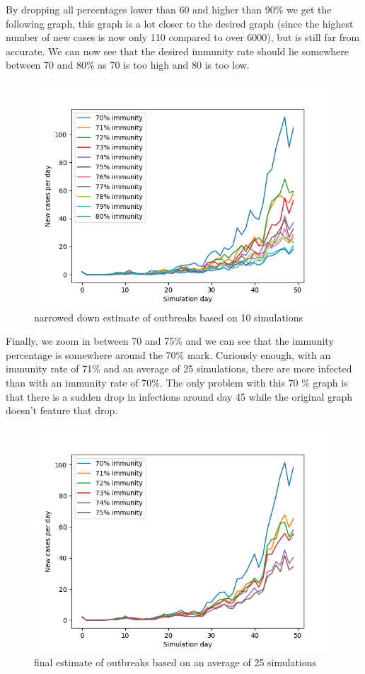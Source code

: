 \documentclass[runningheads]{llncs}
\begin{document}
\newpage
\noindent
By dropping all percentages lower than 60 and higher than 90\% we get the following graph, this graph is a lot closer to the desired graph (since the highest number of new cases is now only 110 compared to over 6000), but is still far from accurate. We can now see that the desired immunity rate should lie somewhere between 70 and 80\% as 70 is too high and 80 is too low.
\begin{figure}
	\includegraphics[width=\textwidth]{test_immunity_70-80.png}
	\caption{narrowed down estimate of outbreaks based on 10 simulations}
\end{figure}

\newpage
\noindent
Finally, we zoom in between 70 and 75\% and we can see that the immunity percentage is somewhere around the 70\% mark. Curiously enough, with an immunity rate of 71\% and an average of 25 simulations, there are more infected than with an immunity rate of 70\%. The only problem with this 70 \% graph is that there is a sudden drop in infections around day 45 while the original graph doesn't feature that drop.
\begin{figure}
	\includegraphics[width=\textwidth]{test_immunity_70-75.png}
	\caption{final estimate of outbreaks based on an average of 25 simulations}
\end{figure}
\newpage
\end{document}
